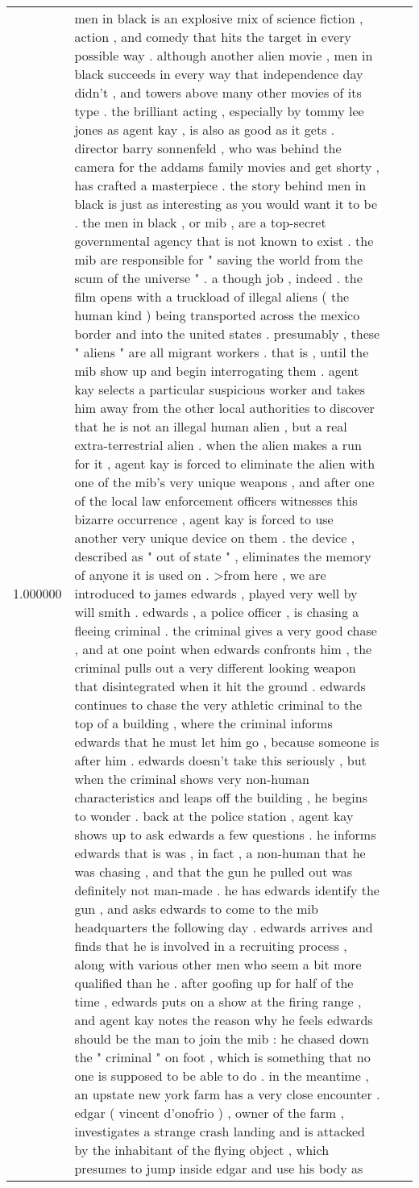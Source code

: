 \begin{tabular}{r{1cm} p{0.4in} r{1cm} p{0.4in}}
1.000000 & men in black is an explosive mix of science fiction , action , and comedy that hits the target in every possible way .  although another alien movie , men in black succeeds in every way that independence day didn't , and towers above many other movies of its type .  the brilliant acting , especially by tommy lee jones as agent kay , is also as good as it gets .  director barry sonnenfeld , who was behind the camera for the addams family movies and get shorty , has crafted a masterpiece .  the story behind men in black is just as interesting as you would want it to be .  the men in black , or mib , are a top-secret governmental agency that is not known to exist .  the mib are responsible for " saving the world from the scum of the universe " .  a though job , indeed .  the film opens with a truckload of illegal aliens ( the human kind ) being transported across the mexico border and into the united states .  presumably , these " aliens " are all migrant workers .  that is , until the mib show up and begin interrogating them .  agent kay selects a particular suspicious worker and takes him away from the other local authorities to discover that he is not an illegal human alien , but a real extra-terrestrial alien .  when the alien makes a run for it , agent kay is forced to eliminate the alien with one of the mib's very unique weapons , and after one of the local law enforcement officers witnesses this bizarre occurrence , agent kay is forced to use another very unique device on them .  the device , described as " out of state " , eliminates the memory of anyone it is used on .  >from here , we are introduced to james edwards , played very well by will smith .  edwards , a police officer , is chasing a fleeing criminal .  the criminal gives a very good chase , and at one point when edwards confronts him , the criminal pulls out a very different looking weapon that disintegrated when it hit the ground .  edwards continues to chase the very athletic criminal to the top of a building , where the criminal informs edwards that he must let him go , because someone is after him .  edwards doesn't take this seriously , but when the criminal shows very non-human characteristics and leaps off the building , he begins to wonder .  back at the police station , agent kay shows up to ask edwards a few questions .  he informs edwards that is was , in fact , a non-human that he was chasing , and that the gun he pulled out was definitely not man-made .  he has edwards identify the gun , and asks edwards to come to the mib headquarters the following day .  edwards arrives and finds that he is involved in a recruiting process , along with various other men who seem a bit more qualified than he .  after goofing up for half of the time , edwards puts on a show at the firing range , and agent kay notes the reason why he feels edwards should be the man to join the mib : he chased down the " criminal " on foot , which is something that no one is supposed to be able to do .  in the meantime , an upstate new york farm has a very close encounter .  edgar ( vincent d'onofrio ) , owner of the farm , investigates a strange crash landing and is attacked by the inhabitant of the flying object , which presumes to jump inside edgar and use his body as 
\end{tabular}
